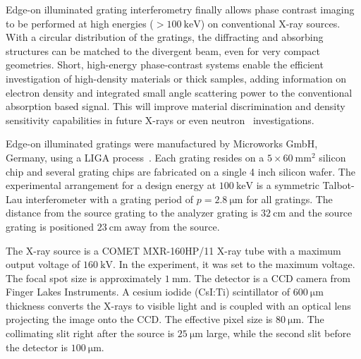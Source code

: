 \documentclass{pnastwo}
\begin{document}
\begin{article}
Edge-on illuminated grating interferometry finally allows phase contrast
imaging to be performed at high energies ($>\SI{100}{\kilo\eV}$) on conventional X-ray
sources. With a circular distribution of the gratings, the diffracting and
absorbing structures can be matched to the divergent beam, even for very
compact geometries. Short, high-energy phase-contrast systems enable the
efficient investigation of high-density materials or thick samples,
adding information on electron density and integrated small angle scattering
power to the conventional absorption based signal. This will improve
material discrimination and density sensitivity capabilities in future
X-rays or even neutron~\cite{Grunzweig2008} investigations.



\begin{materials}
Edge-on illuminated gratings were manufactured by Microworks GmbH, Germany, using a LIGA process~\cite{Kenntner2010}. Each grating
resides on a $\scriptscriptstyle 5 \times \SI{60}{\milli\metre^2}$ silicon chip and several
grating chips are fabricated on a single 4 inch silicon wafer. The
experimental arrangement for a design energy at $\scriptscriptstyle
\SI{100}{\kilo\electronvolt}$
is a symmetric Talbot-Lau interferometer with a grating period of $\scriptscriptstyle p = \SI{2.8}{\micro \metre}$ for all gratings. The distance from the source
grating to the analyzer grating is $\scriptscriptstyle \SI{32}{\centi\metre}$ and the source
grating is positioned $\scriptscriptstyle \SI{23}{\centi\metre}$ away from the source.

The X-ray source is a COMET MXR-160HP/11 X-ray tube with a maximum output
voltage of $\scriptscriptstyle \SI{160}{\kilo\volt}$. In the experiment, it was set to the
maximum voltage. The focal spot size is approximately
$\scriptscriptstyle \SI{1}{\milli\metre}$. The detector is a CCD camera from Finger Lakes
Instruments. A cesium iodide (CsI:Ti) scintillator of $\scriptscriptstyle \SI{600}{\micro
\metre}$ thickness converts the X-rays to visible light and is coupled with
an optical lens projecting the image onto the CCD. The effective pixel size
is $\scriptscriptstyle \SI{80}{\micro \metre}$. The collimating slit right after the source is 
$\scriptscriptstyle \SI{25}{\micro \metre}$ large, while the second slit before the detector is
$\scriptscriptstyle \SI{100}{\micro\metre}$.


\end{materials}
\end{article}
\end{document}
